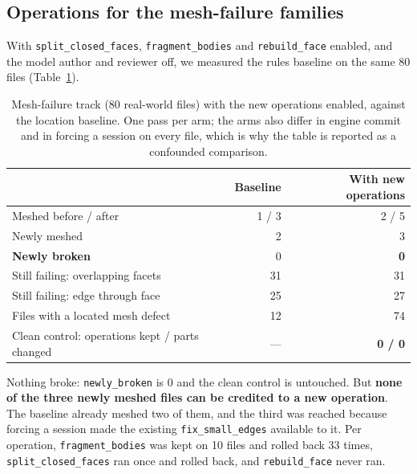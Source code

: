 \documentclass[10pt,onecolumn]{article}
\newcommand{\code}[1]{\texttt{\small #1}}
\begin{document}
\subsection{Operations for the mesh-failure families}

With \code{split\_closed\_faces}, \code{fragment\_bodies} and \code{rebuild\_face} enabled, and the
model author and reviewer off, we measured the rules baseline on the same 80 files
(Table~\ref{tab:mesh}).

\begin{table}[h]
\centering
\caption{Mesh-failure track (80 real-world files) with the new operations enabled, against the
location baseline. One pass per arm; the arms also differ in engine commit and in forcing a session
on every file, which is why the table is reported as a confounded comparison.}
\label{tab:mesh}
\footnotesize
\begin{tabularx}{\textwidth}{@{}X r r@{}}
\toprule
 & \textbf{Baseline} & \textbf{With new operations}\\
\midrule
Meshed before / after                 & 1 / 3 & 2 / 5\\
Newly meshed                          & 2     & 3\\
\textbf{Newly broken}                 & 0     & \textbf{0}\\
Still failing: overlapping facets     & 31    & 31\\
Still failing: edge through face      & 25    & 27\\
Files with a located mesh defect      & 12    & 74\\
Clean control: operations kept / parts changed & --- & \textbf{0 / 0}\\
\bottomrule
\end{tabularx}
\end{table}

Nothing broke: \code{newly\_broken} is 0 and the clean control is untouched. But \textbf{none of
the three newly meshed files can be credited to a new operation}. The baseline already meshed two of
them, and the third was reached because forcing a session made the existing \code{fix\_small\_edges}
available to it. Per operation, \code{fragment\_bodies} was kept on 10 files and rolled back 33
times, \code{split\_closed\_faces} ran once and rolled back, and \code{rebuild\_face} never ran.
\end{document}
